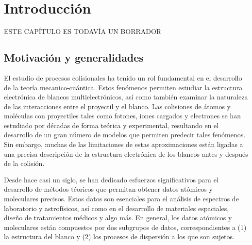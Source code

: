 \chapter{Introducción}

\begin{center}
{\color{red} ESTE CAPÍTULO ES TODAVÍA UN BORRADOR}
\end{center}

\section{Motivación y generalidades}

El estudio de procesos colisionales ha tenido un rol fundamental en el 
desarrollo de la teoría mecanico-cuántica. Estos fenómenos permiten 
estudiar la estructura electrónica de blancos multielectrónicos, así 
como también examinar la naturaleza de las interacciones entre el 
proyectil y el blanco. Las colisiones de átomos y moléculas con 
proyectiles tales como fotones, iones cargados y electrones se han 
estudiado por décadas de forma teórica y experimental, resultando en
el desarrollo de un gran número de modelos que permiten predecir tales 
fenómenos. Sin embargo, muchas de las limitaciones de estas 
aproximaciones están ligadas a una precisa descripción de la estructura 
electrónica de los blancos antes y después de la colisión. 

Desde hace casi un siglo, se han dedicado esfuerzos significativos para
el desarrollo de métodos téoricos que permitan obtener datos atómicos y 
moleculares precisos. Estos datos son esenciales para el análisis de 
espectros de laboratorio y astrofísicos, así como en el desarrollo de 
materiales espaciales, diseño de tratamientos médicos y {\color{red} 
algo más}. En general, los datos atómicos y moleculares están compuestos
por dos subgrupos de datos, correspondientes a (1) la estructura del 
blanco y (2) los procesos de dispersión a los que son sujetos. 



